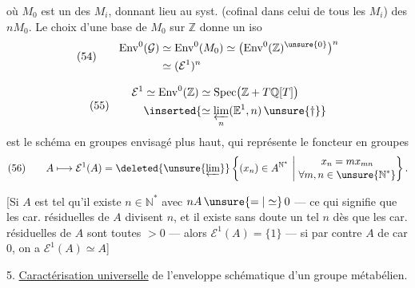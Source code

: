 

où $M_0$ est un des $M_i$, donnant lieu
au syst. (cofinal dans celui de tous les
$M_i$) des $nM_0$. Le choix d'une
base de $M_0$ sur $\mathbb{Z}$ donne un
iso
\[
(54)\qquad
\begin{aligned}
\operatorname{Env}^{0}(\mathcal{G})
&\simeq \operatorname{Env}^{0}(M_0)
\simeq \bigl(\operatorname{Env}^{0}(\mathbb{Z})^{\unsure{0}}\bigr)^n\\
&\simeq(\mathcal{E}^{1})^n
\end{aligned}
\]


\[
(55)\qquad
\begin{aligned}
\mathcal{E}^{1}
&\simeq \operatorname{Env}^{0}(\mathbb{Z})
\simeq\operatorname{Spec}\bigl(\mathbb{Z}+T\mathbb{Q}[T]\bigr)\\
&\inserted{\simeq\varprojlim_n(\mathbb{E}^{1},n)\,\unsure{\dagger}}
\end{aligned}
\]
est le schéma en groupes envisagé plus
haut, qui représente le foncteur en groupes
\[
(56)\qquad
A\longmapsto\mathcal{E}^{1}(A)
=\deleted{\unsure{\varprojlim}}
\left\{(x_n)\in A^{\mathbb{N}^{*}}\ \middle|\
\begin{gathered}
x_n=mx_{mn}\\[-2pt]
\forall m,n\in\unsure{\mathbb{N}^{*}}
\end{gathered}
\right\}.
\]

[Si $A$ est tel qu'il existe $n\in\mathbb{N}^{*}$ avec
$nA\,\unsure{=|\simeq}\,0$ ---
ce qui signifie
que les car. résiduelles de $A$ divisent $n$,
et  il existe sans doute un tel $n$
dès que les car. résiduelles de $A$ sont
toutes $>0$ --- alors $\mathcal{E}^{1}(A)=\{1\}$ ---
si par contre $A$ de car $0$, on a $\mathcal{E}^{1}(A)\simeq A$]



5. \uline{Caractérisation universelle} de l'enveloppe schématique d'un groupe métabélien.

